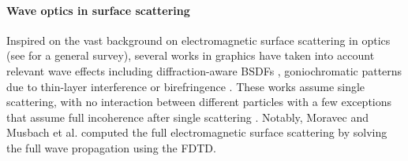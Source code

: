 \paragraph{Wave optics in surface scattering} 
Inspired on the vast background on electromagnetic surface scattering in optics (see \cite{frisvad2020survey} for a general survey), several works in graphics have taken into account relevant wave effects including diffraction-aware BSDFs \cite{he1991comprehensive,stam1999diffraction,cuypers2012reflectance,dong2015predicting,holzschuch2017two, toisoul2017practical, werner2017scratch,yan2018rendering},  goniochromatic patterns due to thin-layer interference \cite{smits1992newton,gondek1994wavelength,belcour2017practical,guillen2020general} or birefringence \cite{steinberg2019analytic}. These works assume single scattering, with no interaction between different particles with a few exceptions that assume full incoherence after single scattering \cite{falster2020computing,guillen2020general}. Notably, Moravec \cite{moravec19813d} and Musbach et al. \cite{musbach2013full} computed the full electromagnetic surface scattering by solving the full wave propagation using the FDTD. 

